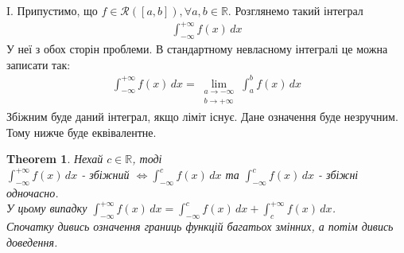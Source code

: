 \documentclass[a4paper, 10pt]{article}
\theoremstyle{theoremdd}
\newtheorem{theorem}{Theorem}[subsection]
\theoremstyle{theoremdd}
\theoremstyle{theoremdd}
\theoremstyle{theoremdd}
\theoremstyle{theoremdd}
\theoremstyle{theoremdd}
\theoremstyle{theoremdd}
\theoremstyle{theoremdd}
\theoremstyle{theoremdd}
\begin{document}
\iffalse
I. Припустимо, що $f \in \mathcal{R}([a,b]), \forall a,b \in \mathbb{R}$. Розглянемо такий інтеграл
\begin{align*}
\int_{-\infty}^{+\infty} f(x)\,dx
\end{align*}
У неї з обох сторін проблеми. В стандартному невласному інтегралі це можна записати так:
\begin{align*}
\int_{-\infty}^{+\infty} f(x)\,dx = \lim_{\substack{a \to -\infty \\ b \to +\infty}} \int_a^b f(x)\,dx
\end{align*}
Збіжним буде даний інтеграл, якщо ліміт існує. Дане означення буде незручним. Тому нижче буде еквівалентне.
\begin{theorem}
Нехай $c \in \mathbb{R}$, тоді\\
$\displaystyle\int_{-\infty}^{+\infty} f(x)\,dx$ - збіжний $\iff \displaystyle\int_{-\infty}^c f(x)\,dx$ та $\displaystyle\int_{-\infty}^c f(x)\,dx$ - збіжні одночасно.\\
У цьому випадку $\displaystyle\int_{-\infty}^{+\infty} f(x)\,dx = \int_{-\infty}^c f(x)\,dx + \int_c^{+\infty} f(x)\,dx$.\\
\textit{Спочатку дивись означення границь функцій багатьох змінних, а потім дивись доведення.}
\end{theorem}
\end{document}
